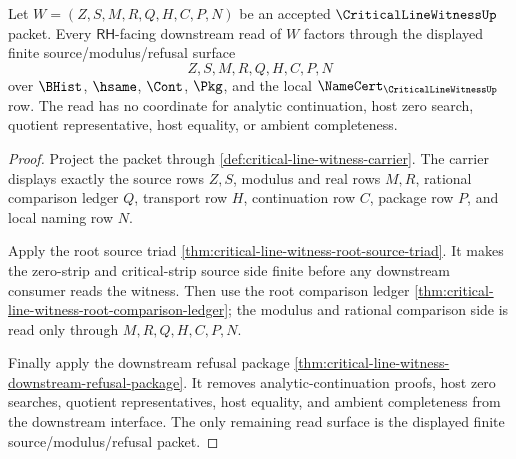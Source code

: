 \begin{theorem}
\label{thm:critical-line-witness-source-modulus-refusal-totality}
Let $W=(Z,S,M,R,Q,H,C,P,N)$ be an accepted $\CriticalLineWitnessUp$ packet. Every $\mathsf{RH}$-facing downstream read of $W$ factors through the displayed finite source/modulus/refusal surface
$$
Z,S,M,R,Q,H,C,P,N
$$
over $\BHist$, $\hsame$, $\Cont$, $\Pkg$, and the local $\NameCert_{\CriticalLineWitnessUp}$ row. The read has no coordinate for analytic continuation, host zero search, quotient representative, host equality, or ambient completeness.
\end{theorem}
\begin{proof}
Project the packet through \autoref{def:critical-line-witness-carrier}. The carrier displays exactly the source rows $Z,S$, modulus and real rows $M,R$, rational comparison ledger $Q$, transport row $H$, continuation row $C$, package row $P$, and local naming row $N$.

Apply the root source triad \autoref{thm:critical-line-witness-root-source-triad}. It makes the zero-strip and critical-strip source side finite before any downstream consumer reads the witness. Then use the root comparison ledger \autoref{thm:critical-line-witness-root-comparison-ledger}; the modulus and rational comparison side is read only through $M,R,Q,H,C,P,N$.

Finally apply the downstream refusal package \autoref{thm:critical-line-witness-downstream-refusal-package}. It removes analytic-continuation proofs, host zero searches, quotient representatives, host equality, and ambient completeness from the downstream interface. The only remaining read surface is the displayed finite source/modulus/refusal packet.
\end{proof}

